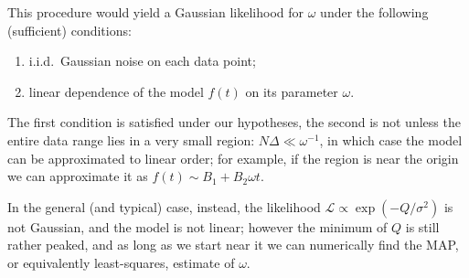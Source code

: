 \documentclass[main.tex]{subfiles}
\begin{document}
This procedure would yield a Gaussian likelihood for \(\omega \) under the following (sufficient) conditions: 
\begin{enumerate}
    \item i.i.d.\ Gaussian noise on each data point;
    \item linear dependence of the model \(f(t)\) on its parameter \(\omega \).
\end{enumerate}

The first condition is satisfied under our hypotheses, the second is not unless the entire data range lies in a very small region: \(N \Delta  \ll \omega^{-1}\), in which case the model can be approximated to linear order; for example, if the region is near the origin we can approximate it as \(f(t) \sim B_1 + B_2 \omega t\).

In the general (and typical) case, instead, the likelihood \(\mathscr{L} \propto \exp(- Q / \sigma^2)\) is not Gaussian, and the model is not linear; however the minimum of \(Q\) is still rather peaked, and as long as we start near it we can numerically find the MAP, or equivalently least-squares, estimate of \(\omega \). 
\end{document}
